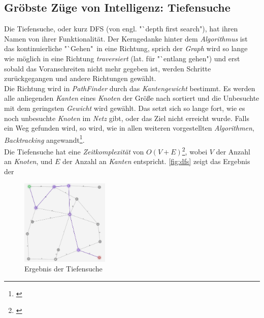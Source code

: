 \documentclass[12pt]{article}
\begin{document}
\subsection{Gröbste Züge von Intelligenz: Tiefensuche}
Die Tiefensuche, oder kurz DFS (von engl. "`depth first search"), hat ihren Namen von ihrer Funktionalität. Der Kerngedanke hinter dem \textit{Algorithmus} ist das kontinuierliche "`Gehen"\ in eine Richtung, sprich der \textit{Graph} wird so lange wie möglich in eine Richtung \textit{traversiert} (lat. für "`entlang gehen") und erst sobald das Voranschreiten nicht mehr gegeben ist, werden Schritte zurückgegangen und andere Richtungen gewählt.
\\
Die Richtung wird in \textit{PathFinder} durch das \textit{Kantengewicht} bestimmt. Es werden alle anliegenden \textit{Kanten} eines \textit{Knoten} der Größe nach sortiert und die Unbesuchte mit dem geringsten \textit{Gewicht} wird gewählt. Das setzt sich so lange fort, wie es noch unbesuchte \textit{Knoten} im \textit{Netz} gibt, oder das Ziel nicht erreicht wurde. Falls ein Weg gefunden wird, so wird, wie in allen weiteren vorgestellten \textit{Algorithmen}, \textit{Backtracking} angewandt\footnote{\cite[Kapitel 22.3, S. 457f]{cormen}}. 
\\
Die Tiefensuche hat eine \textit{Zeitkomplexität} von $O(V + E)$\footnote{\cite[Kapitel 22.3, S. 459]{cormen}}, wobei $V$ der Anzahl an \textit{Knoten}, und $E$ der Anzahl an \textit{Kanten} entspricht. \autoref{fig:dfs} zeigt das Ergebnis der 
\begin{figure}
\vspace{-20pt}
\begin{center}
\includegraphics[width=0.375\textwidth]{res/dfs.png}
\end{center}
\vspace{-30pt}
\centering
\caption{Ergebnis der Tiefensuche}
\label{fig:dfs}
\end{figure}
\end{document}
